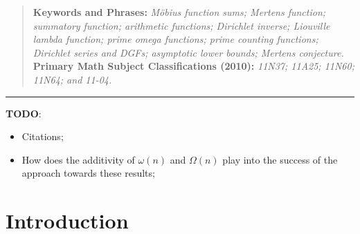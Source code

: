 \documentclass[11pt,reqno,a4letter]{article}
\numberwithin{figure}{section}
\numberwithin{table}{section}
\theoremstyle{plain}
\numberwithin{theorem}{section}
\theoremstyle{definition}
\begin{document}
\begin{abstract}
\bigskip %
\noindent
\textbf{Keywords and Phrases:} {\it M\"obius function sums; Mertens function; summatory function; 
                                    arithmetic functions; 
                                    Dirichlet inverse; Liouville lambda function; prime omega functions; 
                                    prime counting functions; Dirichlet series and DGFs; 
                                    asymptotic lower bounds; Mertens conjecture. } \\ 
\textbf{Primary Math Subject Classifications (2010):} {\it 11N37; 11A25; 11N60; 11N64; and 11-04. } 
\end{abstract} 

\bigskip\hrule\bigskip
\noindent\textbf{TODO}: 
\begin{itemize} 

\item Citations; 
\item How does the additivity of $\omega(n)$ and $\Omega(n)$ play into the 
      success of the approach towards these results;

\end{itemize}

\newpage
\label{Appendix_Glossary_NotationConvs}
     \vskip 0in
     \printglossary[type={symbols},
                    title={Reference on abbreviations, special notation and other conventions},
                    style={glossstyleSymbol},
                    nogroupskip=true]



\newpage
\section{Introduction} 
\end{document}
